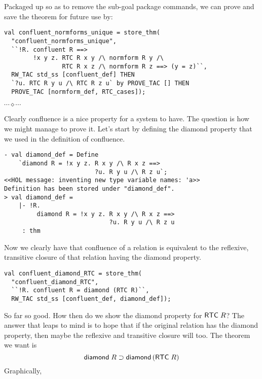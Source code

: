 \documentclass[12pt]{article}
\newcommand{\eos}{\hfill{}$\cdots\diamond\cdots$\hfill{}\vspace{5mm}}
\begin{document}
Packaged up so as to remove the sub-goal package commands, we can
prove and save the theorem for future use by:
\begin{session}\begin{verbatim}
val confluent_normforms_unique = store_thm(
  "confluent_normforms_unique",
  ``!R. confluent R ==>
        !x y z. RTC R x y /\ normform R y /\
                RTC R x z /\ normform R z ==> (y = z)``,
  RW_TAC std_ss [confluent_def] THEN
  `?u. RTC R y u /\ RTC R z u` by PROVE_TAC [] THEN
  PROVE_TAC [normform_def, RTC_cases]);
\end{verbatim}\end{session}
\eos{}

Clearly confluence is a nice property for a system to have.  The
question is how we might manage to prove it.  Let's start by defining
the diamond property that we used in the definition of confluence.
\begin{session}\begin{verbatim}
- val diamond_def = Define
    `diamond R = !x y z. R x y /\ R x z ==>
                         ?u. R y u /\ R z u`;
<<HOL message: inventing new type variable names: 'a>>
Definition has been stored under "diamond_def".
> val diamond_def =
    |- !R.
         diamond R = !x y z. R x y /\ R x z ==>
                             ?u. R y u /\ R z u
     : thm
\end{verbatim}\end{session}
    Now we clearly have that confluence of a relation is equivalent to
    the reflexive, transitive closure of that relation having the
    diamond property.
\begin{session}\begin{verbatim}
val confluent_diamond_RTC = store_thm(
  "confluent_diamond_RTC",
  ``!R. confluent R = diamond (RTC R)``,
  RW_TAC std_ss [confluent_def, diamond_def]);
\end{verbatim}\end{session}
    So far so good.  How then do we show the diamond property for
    ${\sf RTC}\;R$?  The answer that leaps to mind is to hope that if
    the original relation has the diamond property, then maybe the
    reflexive and transitive closure will too.  The theorem we want is
    \[ {\sf diamond}\;R \supset {\sf diamond}\,({\sf RTC}\;R)\] Graphically,
\end{document}
